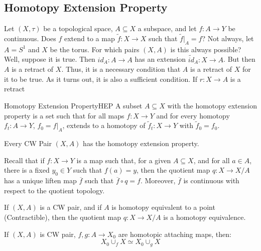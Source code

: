     \subsection{Homotopy Extension Property}
        Let $(X,\tau)$ be a topological space,
        $A\subseteq{X}$ a subspace, and let
        $f:A\rightarrow{Y}$ be continuous. Does
        $f$ extend to a map $\tilde{f}:X\rightarrow{X}$
        such that $\tilde{f}|_{A}=f$? Not always, let
        $A=S^{1}$ and $X$ be the torus. For which pairs
        $(X,A)$ is this always possible? Well, suppose
        it is true. Then $id_{A}:A\rightarrow{A}$ has
        an extension $\tilde{id}_{A}:X\rightarrow{A}$.
        But then $A$ is a retract of $X$. Thus, it
        is a necessary condition that $A$ is a retract
        of $X$ for it to be true. As it turns out, it is
        also a sufficient condition. If
        $r:X\rightarrow{A}$ is a retract
        \begin{ldefinition}{Homotopy Extension Property}{HEP}
            A subset $A\subseteq{X}$ with the homotopy
            extension property is a set such that for all
            maps $f:X\rightarrow{Y}$ and for every
            homotopy $f_{t}:A\rightarrow{Y}$,
            $f_{0}=f|_{A}$, extends to a homotopy of
            $\tilde{f}_{t}:X\rightarrow{Y}$ with
            $\tilde{f}_{0}=f_{0}$.
        \end{ldefinition}
        \begin{theorem}
            Every CW Pair $(X,A)$ has the homotopy
            extension property.
        \end{theorem}
        Recall that if $f:X\rightarrow{Y}$ is a map such that,
        for a given $A\subseteq{X}$, and for all $a\in{A}$,
        there is a fixed $y_{0}\in{Y}$ such that $f(a)=y$, then
        the quotient map $q:X\rightarrow{X/A}$ has a unique
        liften map $\overline{f}$ such that
        $\overline{f}\circ{q}=f$. Moreover, $\overline{f}$ is
        continuous with respect to the quotient topology.
        \begin{theorem}
            If $(X,A)$ is a CW pair, and if $A$ is
            homotopy equivalent to a point
            (Contractible), then the quotient map
            $q:X\rightarrow{X/A}$ is a homotopy
            equivalence.
        \end{theorem}
        \begin{theorem}
            If $(X,A)$ is CW pair, $f,g:A\rightarrow{X_{0}}$
            are homotopic attaching maps, then:
            \begin{equation}
                X_{0}\cup_{f}X\simeq{X}_{0}\cup_{g}X
            \end{equation}
        \end{theorem}

